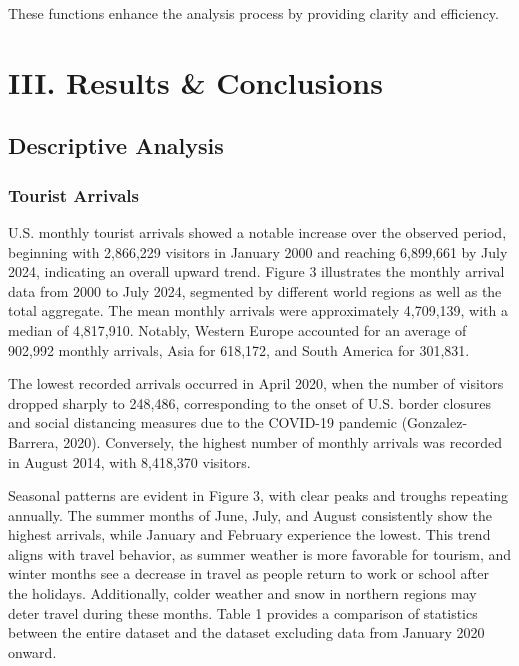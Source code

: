 \documentclass[11pt]{article}
\begin{document}
These functions enhance the analysis process by providing clarity and efficiency.

\section{III. Results \& Conclusions}

\subsection{Descriptive Analysis}

\subsubsection{Tourist Arrivals}

U.S. monthly tourist arrivals showed a notable increase over the observed period, beginning with 2,866,229 visitors in January 2000 and reaching 6,899,661 by July 2024, indicating an overall upward trend. Figure 3 illustrates the monthly arrival data from 2000 to July 2024, segmented by different world regions as well as the total aggregate. The mean monthly arrivals were approximately 4,709,139, with a median of 4,817,910. Notably, Western Europe accounted for an average of 902,992 monthly arrivals, Asia for 618,172, and South America for 301,831.

The lowest recorded arrivals occurred in April 2020, when the number of visitors dropped sharply to 248,486, corresponding to the onset of U.S. border closures and social distancing measures due to the COVID-19 pandemic (Gonzalez-Barrera, 2020). Conversely, the highest number of monthly arrivals was recorded in August 2014, with 8,418,370 visitors.

Seasonal patterns are evident in Figure 3, with clear peaks and troughs repeating annually. The summer months of June, July, and August consistently show the highest arrivals, while January and February experience the lowest. This trend aligns with travel behavior, as summer weather is more favorable for tourism, and winter months see a decrease in travel as people return to work or school after the holidays. Additionally, colder weather and snow in northern regions may deter travel during these months. Table 1 provides a comparison of statistics between the entire dataset and the dataset excluding data from January 2020 onward.
\end{document}

